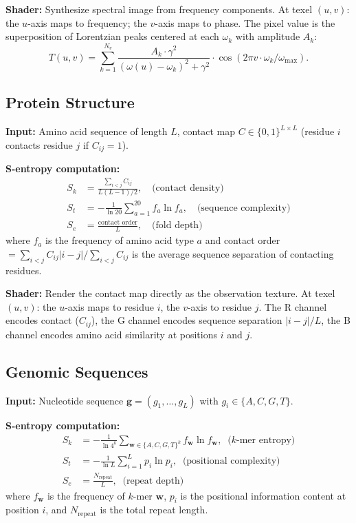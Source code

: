 \documentclass[11pt,twocolumn,a4paper]{article}
\newcommand{\Sk}{S_k}
\newcommand{\St}{S_t}
\newcommand{\Se}{S_e}
\begin{document}
\textbf{Shader:} Synthesize spectral image from frequency components.
At texel $(u,v)$: the $u$-axis maps to frequency; the $v$-axis maps
to phase. The pixel value is the superposition of Lorentzian peaks
centered at each $\omega_k$ with amplitude $A_k$:
\begin{equation}
T(u,v) = \sum_{k=1}^{N_v} \frac{A_k \cdot \gamma^2}
  {(\omega(u) - \omega_k)^2 + \gamma^2}
  \cdot \cos(2\pi v \cdot \omega_k / \omega_{\max}).
\end{equation}

\subsection{Protein Structure}
\label{sec:protein}

\textbf{Input:} Amino acid sequence of length $L$, contact map
$C \in \{0,1\}^{L \times L}$ (residue $i$ contacts residue $j$
if $C_{ij} = 1$).

\textbf{S-entropy computation:}
\begin{align}
\Sk &= \frac{\sum_{i<j} C_{ij}}{L(L-1)/2},
  \quad\text{(contact density)}
\label{eq:prot-Sk} \\
\St &= -\frac{1}{\ln 20}
  \sum_{a=1}^{20} f_a \ln f_a,
  \quad\text{(sequence complexity)}
\label{eq:prot-St} \\
\Se &= \frac{\text{contact order}}{L},
  \quad\text{(fold depth)}
\label{eq:prot-Se}
\end{align}
where $f_a$ is the frequency of amino acid type $a$ and contact
order $= \sum_{i<j} C_{ij} |i-j| / \sum_{i<j} C_{ij}$ is the average
sequence separation of contacting residues.

\textbf{Shader:} Render the contact map directly as the observation
texture. At texel $(u,v)$: the $u$-axis maps to residue $i$, the
$v$-axis to residue $j$. The R channel encodes contact ($C_{ij}$),
the G channel encodes sequence separation $|i-j|/L$, the B channel
encodes amino acid similarity at positions $i$ and $j$.

\subsection{Genomic Sequences}
\label{sec:genomics}

\textbf{Input:} Nucleotide sequence
$\bm{g} = (g_1, \ldots, g_L)$ with $g_i \in \{A, C, G, T\}$.

\textbf{S-entropy computation:}
\begin{align}
\Sk &= -\frac{1}{\ln 4^k}
  \sum_{\bm{w} \in \{A,C,G,T\}^k}
  f_{\bm{w}} \ln f_{\bm{w}},
  \;\;\text{($k$-mer entropy)}
\label{eq:gen-Sk} \\
\St &= -\frac{1}{\ln L}
  \sum_{i=1}^{L} p_i \ln p_i,
  \;\;\text{(positional complexity)}
\label{eq:gen-St} \\
\Se &= \frac{N_{\mathrm{repeat}}}{L},
  \;\;\text{(repeat depth)}
\label{eq:gen-Se}
\end{align}
where $f_{\bm{w}}$ is the frequency of $k$-mer $\bm{w}$, $p_i$ is
the positional information content at position $i$, and
$N_{\mathrm{repeat}}$ is the total repeat length.
\end{document}

